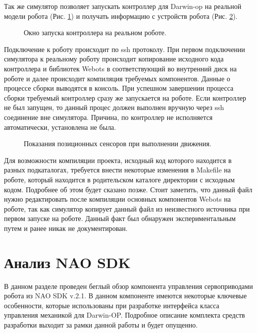 Так же симулятор позволяет запускать контроллер для Darwin-op на реальной модели робота (Рис. \ref{im:1_webots_transfer}) и получать информацию с устройств робота (Рис. \ref{im:1_webots_position_sensors}).

\begin{figure}[h]
\caption{Окно запуска контроллера на реальном роботе.}
\label{im:1_webots_transfer}
\end{figure}

Подключение к роботу происходит по ssh протоколу. При первом подключении симулятора к реальному роботу происходит копирование исходного кода контроллера и библиотек Webots в соответствующий во внутренний диск на роботе и далее происходит компиляция требуемых компонентов. Данные о процессе сборки выводятся в консоль. При успешном завершении процесса сборки требуемый контроллер сразу же запускается на роботе. Если контроллер не был запущен, то данный процес должен выполнен вручную через ssh соединение вне симулятора. Причина, по контроллер не исполняется автоматически, установлена не была.

\begin{figure}[h]
\caption{Показания позиционных сенсоров при выполнении движения.}
\label{im:1_webots_position_sensors}
\end{figure}

Для возможности компиляции проекта, исходный код которого находится в разных подкаталогах, требуется внести некоторые изменения в Makefile на роботе, который находится в родительском каталоге директории с исходным кодом. Подробнее об этом будет сказано позже. Стоит заметить, что данный файл нужно редактировать после компиляции основных компонентов Webots на роботе, так как симулятор копирует данный файл из неизвестного источника при первом запуске на роботе. Данный факт был обнаружен экспериментальным путем и ранее никак не документирован.

\section{Анализ NAO SDK}

В данном разделе проведен беглый обзор компонента управления сервоприводами робота из NAO SDK v.2.1. В данном компоненте имеются некоторые ключевые особенности, которые использованы при разработке интерфейса класса управления механикой для Darwin-OP. Подробное описание комплекта средств разработки выходит за рамки данной работы и будет опущенно.

